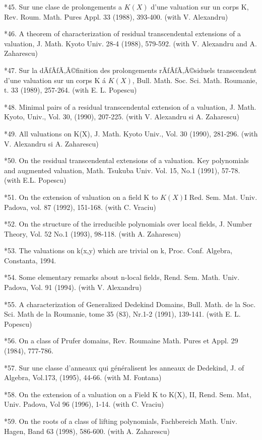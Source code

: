 \documentclass[12pt]{article}
\theoremstyle{plain}
\theoremstyle{definition}
\numberwithin{equation}{section}
\begin{document}
*45.    Sur une clase de prolongements a $K(X)$ d'une valuation sur un corps K, Rev. Roum. Math. Pures Appl. 33 (1988), 393-400. (with V. Alexandru)
 
*46.    A theorem of characterization of residual transcendental extensions of a valuation, J. Math. Kyoto Univ. 28-4 (1988), 579-592. (with V. Alexandru and A. Zaharescu) 

*47.    Sur la dÃƒÂƒÃ‚Â©finition des prolongements rÃƒÂƒÃ‚Â©siduels transcendent d'une valuation sur un corps K \'a $K(X)$, Bull. Math. Soc. Sci. Math. Roumanie, t. 33 (1989), 257-264. (with E. L. Popescu) 

*48.    Minimal pairs of a residual transcendental extension of a valuation, J. Math. Kyoto, Univ., Vol. 30, (1990), 207-225. (with V. Alexandru si A. Zaharescu) 

*49.    All valuations on K(X), J. Math. Kyoto Univ., Vol. 30 (1990), 281-296. (with V. Alexandru si A. Zaharescu) 

*50.    On the residual transcendental extensions of a valuation. Key polynomials and augmented valuation, Math. Tsukuba Univ. Vol. 15, No.1 (1991), 57-78. (with E.L. Popescu) 

*51.    On the extension of valuation on a field K to $K(X)$I Red. Sem. Mat. Univ. Padova, vol. 87 (1992), 151-168. (with C. Vraciu) 

*52.    On the structure of the irreducible polynomials over local fields, J. Number Theory, Vol. 52 No.1 (1993), 98-118. (with A. Zaharescu) 

*53.    The valuations on k(x,y) which are trivial on k, Proc. Conf. Algebra, Constanta, 1994.
 
*54.    Some elementary remarks about n-local fields, Rend. Sem. Math. Univ. Padova, Vol. 91 (1994). (with V. Alexandru) 

*55.    A characterization of Generalized Dedekind Domains, Bull. Math. de la Soc. Sci. Math de la Roumanie, tome 35 (83), Nr.1-2 (1991), 139-141. (with E. L. Popescu)
 
*56.    On a class of Prufer domains, Rev. Roumaine Math. Pures et Appl. 29 (1984), 777-786.

*57.    Sur une classe d'anneaux qui g\'en\'eralisent les anneaux de Dedekind, J. of Algebra, Vol.173, (1995), 44-66. (with M. Fontana) 

*58.    On the extension of a valuation on a Field K to K(X), II, Rend. Sem. Mat, Univ. Padova, Vol 96 (1996), 1-14. (with C. Vraciu)
 
*59.    On the roots of a class of lifting polynomials, Fachbereich Math. Univ. Hagen, Band 63 (1998), 586-600. (with A. Zaharescu)
 
\end{document}

